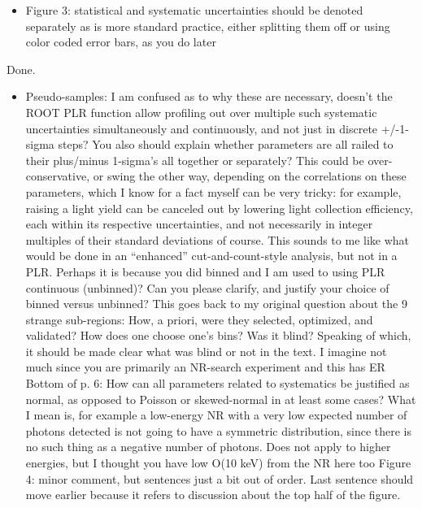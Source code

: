 \documentclass{article}
\begin{document}
\begin{itemize}
	\item {\color{blue} 
Figure 3: statistical and systematic uncertainties should be denoted
separately as is more standard practice, either splitting them off or
using color coded error bars, as you do later}
\end{itemize}

Done.

\begin{itemize}
	\item {\color{blue} Pseudo-samples: I am confused as to why these are necessary, doesn’t
the ROOT PLR function allow profiling out over multiple such
systematic uncertainties simultaneously and continuously, and not just
in discrete +/-1-sigma steps? You also should explain whether
parameters are all railed to their plus/minus 1-sigma’s all together
or separately? This could be over-conservative, or swing the other
way, depending on the correlations on these parameters, which I know
for a fact myself can be very tricky: for example, raising a light
yield can be canceled out by lowering light collection efficiency,
each within its respective uncertainties, and not necessarily in
integer multiples of their standard deviations of course. This sounds
to me like what would be done in an “enhanced” cut-and-count-style
analysis, but not in a PLR. Perhaps it is because you did binned and I
am used to using PLR continuous (unbinned)? Can you please clarify,
and justify your choice of binned versus unbinned? This goes back to
my original question about the 9 strange sub-regions: How, a priori,
were they selected, optimized, and validated? How does one choose
one’s bins? Was it blind? Speaking of which, it should be made clear
what was blind or not in the text. I imagine not much since you are
primarily an NR-search experiment and this has ER Bottom of p. 6: How
can all parameters related to systematics be justified as normal, as
opposed to Poisson or skewed-normal in at least some cases? What I
mean is, for example a low-energy NR with a very low expected number
of photons detected is not going to have a symmetric distribution,
since there is no such thing as a negative number of photons. Does not
apply to higher energies, but I thought you have low O(10 keV) from
the NR here too Figure 4: minor comment, but sentences just a bit out
of order. Last sentence should move earlier because it refers to
discussion about the top half of the figure.}
\end{itemize}
\end{document}
